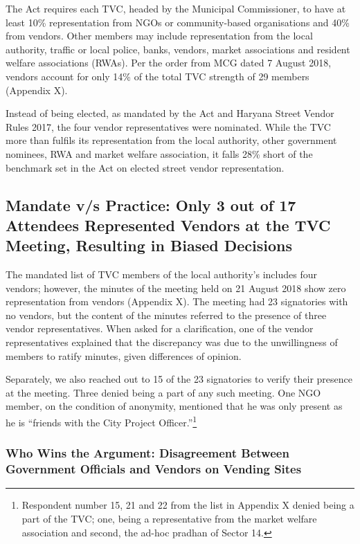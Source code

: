 \documentclass[a4paper, 12pt, twoside]{article}
\begin{document}
The Act requires each TVC, headed by the Municipal Commissioner, to have at least 10\% representation from NGOs or community-based organisations and 40\% from vendors. Other members may include representation from the local authority, traffic or local police, banks, vendors, market associations and resident welfare associations (RWAs). Per the order from MCG dated 7 August 2018, vendors account for only 14\% of the total TVC strength of 29 members (Appendix X).

Instead of being elected, as mandated by the Act and Haryana Street Vendor Rules 2017, the four vendor representatives were nominated. While the TVC more than fulfils its representation from the local authority, other government nominees, RWA and market welfare association, it falls 28\% short of the benchmark set in the Act on elected street vendor representation. 

\subsection{Mandate v/s Practice: Only 3 out of 17 Attendees Represented Vendors at the TVC Meeting, Resulting in Biased Decisions}

The mandated list of TVC members of the local authority’s includes four vendors; however, the minutes of the meeting held on 21 August 2018 show zero representation from vendors (Appendix X). The meeting had 23 signatories with no vendors, but the content of the minutes referred to the presence of three vendor representatives. When asked for a clarification, one of the vendor representatives explained that the discrepancy was due to the unwillingness of members to ratify minutes, given differences of opinion. 

Separately, we also reached out to 15 of the 23 signatories to verify their presence at the meeting. Three denied being a part of any such meeting. One NGO member, on the condition of anonymity, mentioned that he was only present as he is “friends with the City Project Officer.”\footnote{ Respondent number 15, 21 and 22 from the list in Appendix X denied being a part of the TVC; one, being a representative from the market welfare association and second, the ad-hoc pradhan of Sector 14.}

\subsubsection{Who Wins the Argument: Disagreement Between Government Officials and Vendors on Vending Sites}
\end{document}
